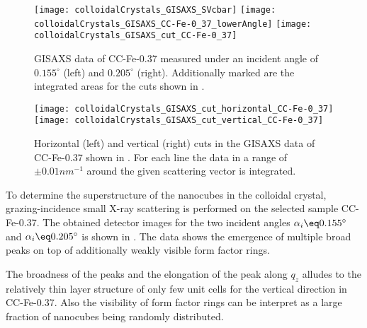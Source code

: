\documentclass[\main/dresen_thesis.tex]{subfiles}
\begin{document}
  \label{sec:colloidalCrystals:layers:gisaxs}
  \begin{figure}[tb]
    \centering
    \texttt{[image: colloidalCrystals\_GISAXS\_SVcbar]}
    \texttt{[image: colloidalCrystals\_GISAXS\_CC-Fe-0\_37\_lowerAngle]}
    \texttt{[image: colloidalCrystals\_GISAXS\_cut\_CC-Fe-0\_37]}
    \caption{\label{fig:colloidalCrystals:layers:gisaxs}GISAXS data of CC-Fe-0.37 measured under an incident angle of $0.155 ^\circ$ (left) and $0.205 ^\circ$ (right). Additionally marked are the integrated areas for the cuts shown in .}
  \end{figure}

  \begin{figure}[tb]
    \centering
    \texttt{[image: colloidalCrystals\_GISAXS\_cut\_horizontal\_CC-Fe-0\_37]}
    \texttt{[image: colloidalCrystals\_GISAXS\_cut\_vertical\_CC-Fe-0\_37]}
    \caption{\label{fig:colloidalCrystals:layers:gisaxsCuts}Horizontal (left) and vertical (right) cuts in the GISAXS data of CC-Fe-0.37 shown in . For each line the data in a range of $\pm 0.01 \unit{nm^{-1}}$ around the given scattering vector is integrated.}
  \end{figure}



  To determine the superstructure of the nanocubes in the colloidal crystal, grazing-incidence small X-ray scattering is performed on the selected sample CC-Fe-0.37.
  The obtained detector images for the two incident angles $\alpha_i \eq 0.155^\circ$ and $\alpha_i \eq 0.205^\circ$ is shown in .
  The data shows the emergence of multiple broad peaks on top of additionally  weakly visible form factor rings.

  The broadness of the peaks and the elongation of the peak along $q_z$ alludes to the relatively thin layer structure of only few unit cells for the vertical direction in CC-Fe-0.37.
  Also the visibility of form factor rings can be interpret as a large fraction of nanocubes being randomly distributed.
\end{document}
